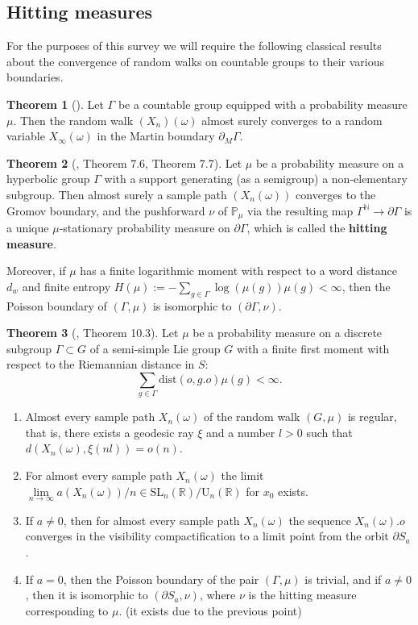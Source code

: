 \documentclass[11pt]{amsart}
\theoremstyle{definition}
\newtheorem{theorem}{Theorem}[section]
\begin{document}
		\subsection{Hitting measures}
		For the purposes of this survey we will require the following classical results about the convergence of random walks on countable groups to their various boundaries.
		\begin{theorem}[\cite{woess_2000}]
			\label{general convergence to Martin}
			Let $\Gamma$ be a countable group equipped with a probability measure $\mu$. Then the random walk $(X_n)(\omega)$ almost surely converges to a random variable $X_\infty(\omega)$ in the Martin boundary $\partial_M \Gamma$.
		\end{theorem}
		\begin{theorem}[\cite{kaimanovich2000poisson}, Theorem 7.6, Theorem 7.7]
			\label{hyperbolic convergence to Gromov}
			Let $\mu$ be a probability measure on a hyperbolic group $\Gamma$ with a support generating (as a semigroup) a non-elementary subgroup. Then almost surely a sample path $(X_n(\omega))$ converges to the Gromov boundary, and the pushforward $\nu$ of $\mathbb{P}_\mu$ via the resulting map $\Gamma^\mathbb{N} \rightarrow \partial \Gamma$ is a unique $\mu$-stationary probability measure on $\partial \Gamma$, which is called the \textbf{hitting measure}. 
			
			Moreover, if $\mu$ has a finite logarithmic moment with respect to a word distance $d_w$ and finite entropy $H(\mu) := - \sum_{g \in \Gamma} \log(\mu(g)) \mu(g) < \infty$, then the Poisson boundary of $(\Gamma, \mu)$ is isomorphic to $(\partial \Gamma, \nu)$.
		\end{theorem}
		\begin{theorem}[\cite{kaimanovich2000poisson}, Theorem 10.3]
			\label{higher-rank convergence to Furstenberg}
			Let $\mu$ be a probability measure on a discrete subgroup $\Gamma \subset G$ of a semi-simple Lie group $G$ with a finite first moment with respect to the Riemannian distance in $S$: 
			\[
			\sum_{g \in \Gamma} \text{dist}(o, g.o) \mu(g) < \infty.
			\]
			\begin{enumerate}
				\item Almost every sample path $X_n(\omega)$ of the random walk $(G, \mu)$ is regular, that is, there exists a geodesic ray $\xi$ and a number $l > 0$ such that $d(X_n(\omega), \xi(nl)) = o(n)$. 
				\item For almost every sample path $X_n(\omega)$ the limit $\lim\limits_{n \rightarrow \infty} a(X_n(\omega))/n \in \text{SL}_n(\mathbb{R}) / \text{U}_n(\mathbb{R})$ for $x_0$ exists.
				\item If $a \ne 0$, then for almost every sample path $X_n(\omega)$ the sequence $X_n(\omega).o$ converges in the visibility compactification to a limit point from the orbit $\partial S_a$.
				\item If $a = 0$, then the Poisson boundary of the pair $(\Gamma, \mu)$ is trivial, and if $a \ne 0$, then it is isomorphic to $(\partial S_a, \nu)$, where $\nu$ is the hitting measure corresponding to $\mu$. (it exists due to the previous point)
			\end{enumerate} 
		\end{theorem}
\end{document}
